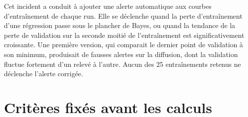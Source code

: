 \documentclass[a4paper, 11pt]{article}
\begin{document}
Cet incident a conduit à ajouter une alerte automatique aux courbes d'entraînement de chaque run. Elle se déclenche quand la
perte d'entraînement d'une régression passe sous le plancher de Bayes, ou quand la tendance de la perte de validation sur la
seconde moitié de l'entraînement est significativement croissante. Une première version, qui comparait le dernier point de
validation à son minimum, produisait de fausses alertes sur la diffusion, dont la validation fluctue fortement d'un relevé à
l'autre. Aucun des 25 entraînements retenus ne déclenche l'alerte corrigée.

\section{Critères fixés avant les calculs}\label{app:criteres}
\end{document}
